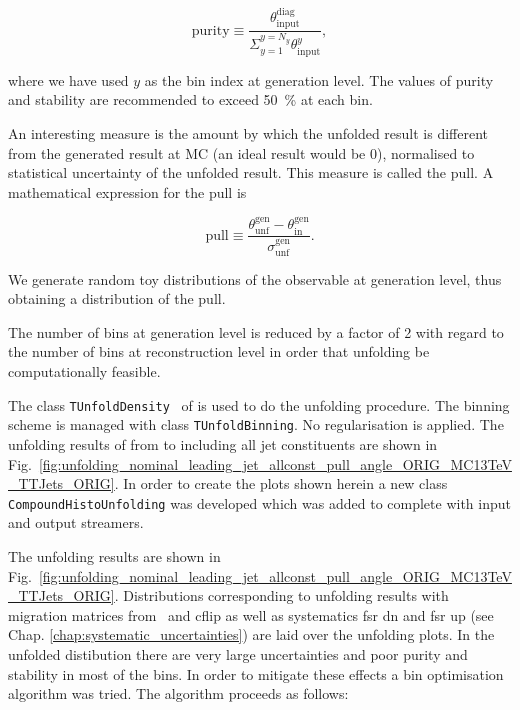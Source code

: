 \begin{equation}
  \text{purity}\equiv\frac{\theta^{\text{diag}}_{\text{input}}}{\Sigma_{y=1}^{y=N_{y}}\theta^{y}_{\text{input}}},
\end{equation}

where we have used $y$ as the bin index at generation level. The values of purity and stability are recommended to exceed 50~\% at each bin.

An interesting measure is the amount by which the unfolded result is different from the generated result at MC (an ideal result would be 0), normalised to statistical uncertainty of the unfolded result. This measure is called the pull. A mathematical expression for the pull is

\begin{equation}
  \text{pull}\equiv\frac{\theta^{\text{gen}}_{\text{unf}}-\theta^{\text{gen}}_{\text{in}}}{\sigma^{\text{gen}}_{\text{unf}}}.
\end{equation}

We generate random toy distributions of the observable at generation level, thus obtaining a distribution of the pull.

The number of bins at generation level is reduced by a factor of 2 with regard to the number of bins at reconstruction level in order that unfolding be computationally feasible.

The class \lstinline[language=sh]|TUnfoldDensity|~\cite{Schmitt:2012kp} of \ROOT is used to do the unfolding procedure. The binning scheme is managed with class \lstinline[language=sh]|TUnfoldBinning|. No regularisation is applied. The unfolding results of \pullangle from \leadingjet to \scndleadingjet including all jet constituents are shown in Fig.~\ref{fig:unfolding_nominal_leading_jet_allconst_pull_angle_ORIG_MC13TeV_TTJets_ORIG}. In order to create the plots shown herein a new class \lstinline[language=sh]|CompoundHistoUnfolding| \cite{url:compoundhistounfolding} was developed which was added to \ROOT complete with input and output streamers.

The unfolding results are shown in Fig.~\ref{fig:unfolding_nominal_leading_jet_allconst_pull_angle_ORIG_MC13TeV_TTJets_ORIG}. Distributions corresponding to unfolding results with migration matrices from \ttbar\ \HERWIGpp and \ttbar cflip as well as systematics \ttbar fsr dn and \ttbar fsr up (see Chap. \ref{chap:systematic_uncertainties}) are laid over the unfolding plots. In the unfolded distibution there are very large uncertainties and poor purity and stability in most of the bins. In order to mitigate these effects a bin optimisation algorithm was tried. The algorithm proceeds as follows:

